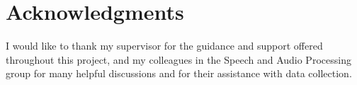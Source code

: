 
\chapter*{Acknowledgments}

I would like to thank my supervisor for the guidance and support offered
throughout this project, and my colleagues in the Speech and Audio
Processing group for many helpful discussions and for their assistance
with data collection.
